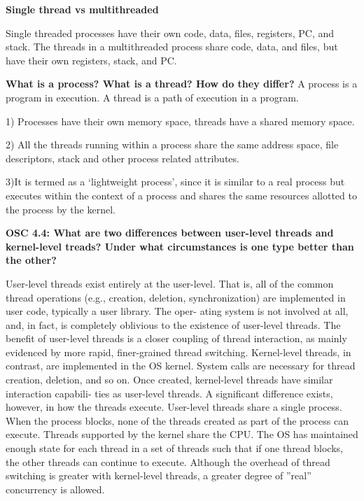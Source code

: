 \documentclass[8pt,landscape]{article}
\begin{document}
\begin{multicols}{3}
\begin{tiny}
\textbf{Single thread vs multithreaded}

Single threaded processes have their own code, data, files, registers, PC, and stack.
The threads in a multithreaded process share code, data, and files, but have their own registers,
stack, and PC.

\textbf{What is a process? What is a thread? How do they differ?} 
A process is a program in execution. A thread is a path of execution in a program.

1) Processes have their own memory space, threads have a shared memory space. 

2) All the threads running within a process share the same address space, file descriptors, stack 
and other process related attributes. 

3)It is termed as a ‘lightweight process’, since it is similar to a real process but executes 
within the context of a process and shares the same resources allotted to the process by the 
kernel.

\textbf{OSC 4.4: What are two differences between user-level threads and kernel-level treads? Under what circumstances is one type better than the other?}

User-level threads exist entirely at the user-level.  That is, all of the common thread operations
(e.g., creation, deletion, synchronization) are implemented in user code, typically a user library.  The oper-
ating system is not involved at all, and, in fact, is completely oblivious to the existence of user-level threads.
The benefit of user-level threads is a closer coupling of thread interaction, as mainly evidenced by more
rapid, finer-grained thread switching.
Kernel-level threads,  in contrast,  are implemented in the OS kernel.   System calls are necessary for
thread creation, deletion, and so on.  Once created, kernel-level threads have similar interaction capabili-
ties as user-level threads.  A significant difference exists, however, in how the threads execute.  User-level
threads share a single process.  When the process blocks, none of the threads created as part of the process
can execute. Threads supported by the kernel share the CPU. The OS has maintained enough state for each
thread in a set of threads such that if one thread blocks, the other threads can continue to execute. Although
the overhead of thread switching is greater with kernel-level threads, a greater degree of ”real” concurrency
is allowed.


\end{tiny}
\end{multicols}
\end{document}

